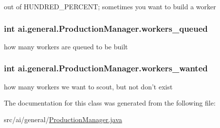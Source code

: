 \label{classai_1_1general_1_1_production_manager_afe60230ce2b887ac1eb35061f9c0fbaa}
out of HUNDRED\_\-PERCENT; sometimes you want to build a worker \hypertarget{classai_1_1general_1_1_production_manager_a32f144df17dc697bcb9cfa06832497e8}{
\subsubsection[{workers\_\-queued}]{\setlength{\rightskip}{0pt plus 5cm}int {\bf ai.general.ProductionManager.workers\_\-queued}}}
\label{classai_1_1general_1_1_production_manager_a32f144df17dc697bcb9cfa06832497e8}
how many workers are queued to be built \hypertarget{classai_1_1general_1_1_production_manager_a01078f7b8aac811ea7813ad1a3bd9e11}{
\subsubsection[{workers\_\-wanted}]{\setlength{\rightskip}{0pt plus 5cm}int {\bf ai.general.ProductionManager.workers\_\-wanted}}}
\label{classai_1_1general_1_1_production_manager_a01078f7b8aac811ea7813ad1a3bd9e11}
how many workers we want to scout, but not don't exist 

The documentation for this class was generated from the following file:\begin{DoxyCompactItemize}
\item 
src/ai/general/\hyperlink{_production_manager_8java}{ProductionManager.java}\end{DoxyCompactItemize}
